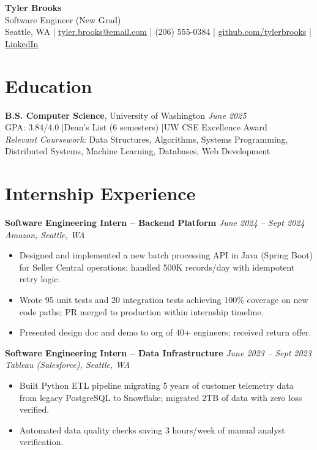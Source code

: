 \documentclass[11pt,a4paper]{article}
\begin{document}
\begin{center}
  {\LARGE \textbf{Tyler Brooks}}\\[3pt]
  {\large \textcolor{accent}{Software Engineer (New Grad)}}\\[4pt]
  Seattle, WA \quad|\quad
  \href{mailto:tyler.brooks@email.com}{tyler.brooks@email.com} \quad|\quad
  (206) 555-0384 \quad|\quad
  \href{https://github.com/tylerbrooks}{github.com/tylerbrooks} \quad|\quad
  \href{https://linkedin.com/in/tylerbrooks}{LinkedIn}
\end{center}

\section{Education}
\noindent\textbf{B.S. Computer Science}, University of Washington \hfill \textit{June 2025}\\
GPA: 3.84/4.0 \quad|\quad Dean's List (6 semesters) \quad|\quad UW CSE Excellence Award\\
\textit{Relevant Coursework:} Data Structures, Algorithms, Systems Programming, Distributed Systems, Machine Learning, Databases, Web Development

\section{Internship Experience}

\noindent\textbf{Software Engineering Intern -- Backend Platform} \hfill \textit{June 2024 -- Sept 2024}\\
\textit{Amazon, Seattle, WA}
\begin{itemize}
  \item Designed and implemented a new batch processing API in Java (Spring Boot) for Seller Central operations; handled 500K records/day with idempotent retry logic.
  \item Wrote 95 unit tests and 20 integration tests achieving 100\% coverage on new code paths; PR merged to production within internship timeline.
  \item Presented design doc and demo to org of 40+ engineers; received return offer.
\end{itemize}

\vspace{4pt}
\noindent\textbf{Software Engineering Intern -- Data Infrastructure} \hfill \textit{June 2023 -- Sept 2023}\\
\textit{Tableau (Salesforce), Seattle, WA}
\begin{itemize}
  \item Built Python ETL pipeline migrating 5 years of customer telemetry data from legacy PostgreSQL to Snowflake; migrated 2TB of data with zero loss verified.
  \item Automated data quality checks saving 3 hours/week of manual analyst verification.
\end{itemize}
\end{document}
